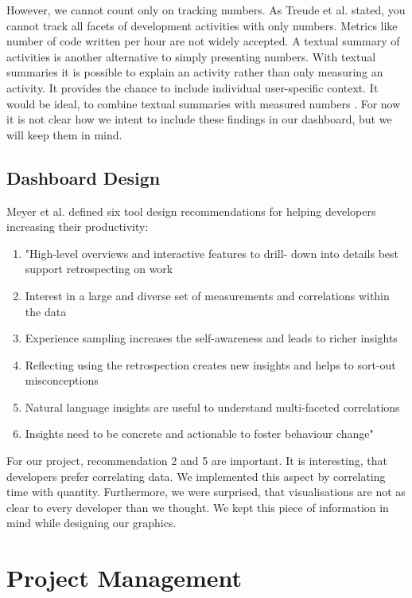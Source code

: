 \documentclass{seal_article}
\begin{document}
	However, we cannot count only on tracking numbers. As Treude et al. \cite{Treude:2015:SMD:2786805.2786827} stated, you cannot track all facets of development activities with only numbers. Metrics like number of code written per hour are not widely accepted. A textual summary of activities is another alternative to simply presenting numbers. With textual summaries it is possible to explain an activity rather than only measuring an activity. It provides the chance to include individual user-specific context. It would be ideal, to combine textual summaries with measured numbers \cite{Treude:2015:SMD:2786805.2786827}. For now it is not clear how we intent to include these findings in our dashboard, but we will keep them in mind. 
\subsection{Dashboard Design}

Meyer et al. \cite{Meyer:2017:DRS:3171581.3134714} defined six tool design recommendations for helping developers increasing their productivity:
\begin{enumerate}
	\item "High-level overviews and interactive features to drill- down into details best support retrospecting on work
	\item Interest in a large and diverse set of measurements and correlations within the data
	\item Experience sampling increases the self-awareness and leads to richer insights
	\item Reflecting using the retrospection creates new insights and helps to sort-out misconceptions
	\item Natural language insights are useful to understand multi-faceted correlations
	\item Insights need to be concrete and actionable to foster behaviour change" \cite[p. 2]{Meyer:2017:DRS:3171581.3134714}
\end{enumerate}
For our project, recommendation 2 and 5 are important. It is interesting, that developers prefer correlating data. We implemented this aspect by correlating time with quantity. Furthermore, we were surprised, that visualisations are not as clear to every developer than we thought. We kept this piece of information in mind while designing our graphics. 

\section{Project Management}
\end{document}
